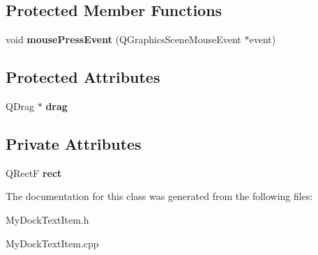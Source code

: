 \subsection*{Protected Member Functions}
\begin{DoxyCompactItemize}
\item 
\hypertarget{class_my_dock_text_item_a2948d3050a83589e02305a85022ef3e7}{}void {\bfseries mouse\+Press\+Event} (Q\+Graphics\+Scene\+Mouse\+Event $\ast$event)\label{class_my_dock_text_item_a2948d3050a83589e02305a85022ef3e7}

\end{DoxyCompactItemize}
\subsection*{Protected Attributes}
\begin{DoxyCompactItemize}
\item 
\hypertarget{class_my_dock_text_item_a8cb7660e2e72b8318a9365dbfbc8998e}{}Q\+Drag $\ast$ {\bfseries drag}\label{class_my_dock_text_item_a8cb7660e2e72b8318a9365dbfbc8998e}

\end{DoxyCompactItemize}
\subsection*{Private Attributes}
\begin{DoxyCompactItemize}
\item 
\hypertarget{class_my_dock_text_item_aea8d4efdc23abf4ed9ddcfca26ec7a13}{}Q\+Rect\+F {\bfseries rect}\label{class_my_dock_text_item_aea8d4efdc23abf4ed9ddcfca26ec7a13}

\end{DoxyCompactItemize}


The documentation for this class was generated from the following files\+:\begin{DoxyCompactItemize}
\item 
My\+Dock\+Text\+Item.\+h\item 
My\+Dock\+Text\+Item.\+cpp\end{DoxyCompactItemize}
